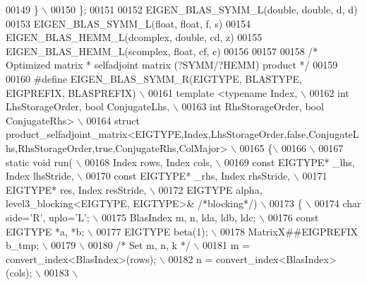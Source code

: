 \begin{DoxyCode}
00149 \textcolor{preprocessor}{  \} \(\backslash\)}
00150 \textcolor{preprocessor}{\};}
00151 
00152 EIGEN\_BLAS\_SYMM\_L(\textcolor{keywordtype}{double}, \textcolor{keywordtype}{double}, d, d)
00153 EIGEN\_BLAS\_SYMM\_L(\textcolor{keywordtype}{float}, \textcolor{keywordtype}{float}, f, s)
00154 EIGEN\_BLAS\_HEMM\_L(dcomplex, \textcolor{keywordtype}{double}, cd, z)
00155 EIGEN\_BLAS\_HEMM\_L(scomplex, \textcolor{keywordtype}{float}, cf, c)
00156 
00157 
00158 \textcolor{comment}{/* Optimized matrix * selfadjoint matrix (?SYMM/?HEMM) product */}
00159 
00160 \textcolor{preprocessor}{#define EIGEN\_BLAS\_SYMM\_R(EIGTYPE, BLASTYPE, EIGPREFIX, BLASPREFIX) \(\backslash\)}
00161 \textcolor{preprocessor}{template <typename Index, \(\backslash\)}
00162 \textcolor{preprocessor}{          int LhsStorageOrder, bool ConjugateLhs, \(\backslash\)}
00163 \textcolor{preprocessor}{          int RhsStorageOrder, bool ConjugateRhs> \(\backslash\)}
00164 \textcolor{preprocessor}{struct
       product\_selfadjoint\_matrix<EIGTYPE,Index,LhsStorageOrder,false,ConjugateLhs,RhsStorageOrder,true,ConjugateRhs,ColMajor> \(\backslash\)}
00165 \textcolor{preprocessor}{\{\(\backslash\)}
00166 \textcolor{preprocessor}{\(\backslash\)}
00167 \textcolor{preprocessor}{  static void run( \(\backslash\)}
00168 \textcolor{preprocessor}{    Index rows, Index cols, \(\backslash\)}
00169 \textcolor{preprocessor}{    const EIGTYPE* \_lhs, Index lhsStride, \(\backslash\)}
00170 \textcolor{preprocessor}{    const EIGTYPE* \_rhs, Index rhsStride, \(\backslash\)}
00171 \textcolor{preprocessor}{    EIGTYPE* res,        Index resStride, \(\backslash\)}
00172 \textcolor{preprocessor}{    EIGTYPE alpha, level3\_blocking<EIGTYPE, EIGTYPE>& }\textcolor{comment}{/*blocking*/}\textcolor{preprocessor}{) \(\backslash\)}
00173 \textcolor{preprocessor}{  \{ \(\backslash\)}
00174 \textcolor{preprocessor}{    char side='R', uplo='L'; \(\backslash\)}
00175 \textcolor{preprocessor}{    BlasIndex m, n, lda, ldb, ldc; \(\backslash\)}
00176 \textcolor{preprocessor}{    const EIGTYPE *a, *b; \(\backslash\)}
00177 \textcolor{preprocessor}{    EIGTYPE beta(1); \(\backslash\)}
00178 \textcolor{preprocessor}{    MatrixX##EIGPREFIX b\_tmp; \(\backslash\)}
00179 \textcolor{preprocessor}{\(\backslash\)}
00180 \textcolor{preprocessor}{}\textcolor{comment}{/* Set m, n, k */}\textcolor{preprocessor}{ \(\backslash\)}
00181 \textcolor{preprocessor}{    m = convert\_index<BlasIndex>(rows);  \(\backslash\)}
00182 \textcolor{preprocessor}{    n = convert\_index<BlasIndex>(cols);  \(\backslash\)}
00183 \textcolor{preprocessor}{\(\backslash\)}

\end{DoxyCode}

